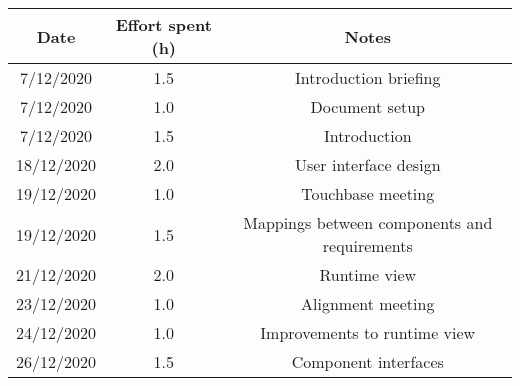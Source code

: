 \documentclass[../../main.tex]{subfiles}
\begin{document}
\begin{center}
    \begin{tabular}{|c| |c| |c|} 
        \hline
        Date & Effort spent (h) & Notes\\ [0.5ex] 
        \hline\hline
        7/12/2020 & 1.5 & Introduction briefing\\ 
        7/12/2020 & 1.0 & Document setup\\
        7/12/2020 & 1.5 & Introduction\\
        18/12/2020 & 2.0 & User interface design\\
        19/12/2020 & 1.0 & Touchbase meeting\\
        19/12/2020 & 1.5 & Mappings between components and requirements\\
        21/12/2020 & 2.0 & Runtime view\\
        23/12/2020 & 1.0 & Alignment meeting\\
        24/12/2020 & 1.0 & Improvements to runtime view\\
        26/12/2020 & 1.5 & Component interfaces\\
        \hline
    \end{tabular}
\end{center}
\end{document}
